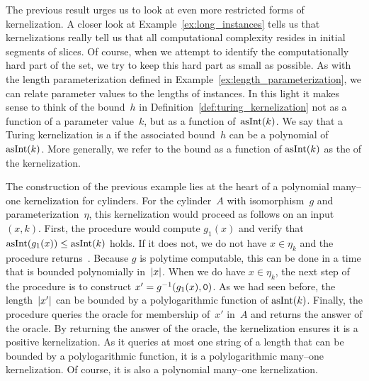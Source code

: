The previous result urges us to look at even more restricted forms of kernelization.
A closer look at Example~\ref{ex:long_instances} tells us that kernelizations really tell us that all computational complexity resides in initial segments of slices.
Of course, when we attempt to identify the computationally hard part of the set, we try to keep this hard part as small as possible.
As with the length parameterization defined in Example~\ref{ex:length_parameterization}, we can relate parameter values to the lengths of instances.
In this light it makes sense to think of the bound~$h$ in Definition~\ref{def:turing_kernelization} not as a function of a parameter value~$k$, but as a function of~$\operatorname{asInt}(k)$.
We say that a Turing kernelization is a  if the associated bound~$h$ can be a polynomial of~$\operatorname{asInt}(k)$.
More generally, we refer to the bound as a function of $\operatorname{asInt}(k)$ as the  of the kernelization.
\begin{example}
  The construction of the previous example lies at the heart of a polynomial many--one kernelization for \pdash{}cylinders.
  For the \pdash{}cylinder~$A$ with isomorphism~$g$ and parameterization~$\eta$, this kernelization would proceed as follows on an input~$(x, k)$.
  First, the procedure would compute $g_1(x)$ and verify that $\operatorname{asInt}(g_1(x)) \le \operatorname{asInt}(k)$ holds.
  If it does not, we do not have $x \in \eta_k$ and the procedure returns~.
  Because $g$ is polytime computable, this can be done in a time that is bounded polynomially in~${\lvert x\rvert}$.
  When we do have $x \in \eta_k$, the next step of the procedure is to construct $x' = g^{-1}(g_1(x), \textnormal{\texttt{0}})$.
  As we had seen before, the length~${\lvert x'\rvert}$ can be bounded by a polylogarithmic function of $\operatorname{asInt}(k)$.
  Finally, the procedure queries the oracle for membership of~$x'$ in~$A$ and returns the answer of the oracle.
  By returning the answer of the oracle, the kernelization ensures it is a positive kernelization.
  As it queries at most one string of a length that can be bounded by a polylogarithmic function, it is a polylogarithmic many--one kernelization.
  Of course, it is also a polynomial many--one kernelization.
\end{example}

